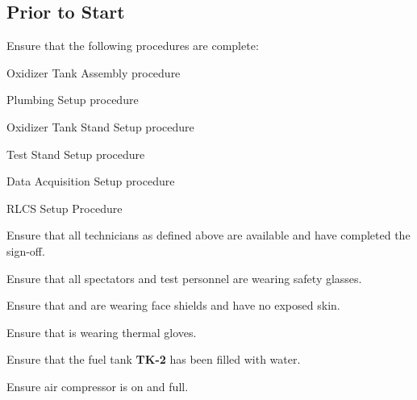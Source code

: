 \subsection{Prior to Start}
\begin{checklist}
    \item Ensure that the following procedures are complete:
    \begin{checklist}
        \item Oxidizer Tank Assembly procedure
        \item Plumbing Setup procedure
        \item Oxidizer Tank Stand Setup procedure
        \item Test Stand Setup procedure
        \item Data Acquisition Setup procedure
        \item RLCS Setup Procedure
    \end{checklist}
    \item Ensure that all technicians as defined above are available and have completed the sign-off.
    \item Ensure that all spectators and test personnel are wearing safety glasses.
    \item Ensure that \primary{} and \secondary{} are wearing face shields and have no exposed skin.
    \item Ensure that \primary{} is wearing thermal gloves.
    \item Ensure that the fuel tank \textbf{TK-2} has been filled with water. 
    \item Ensure air compressor is on and full. 
\end{checklist}
\setcounter{checklistnum}{0}

\newpage
